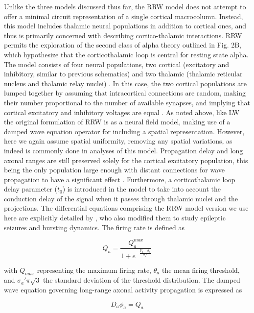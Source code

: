 \documentclass[12pt,twoside]{article}
\begin{document}
Unlike the three models discussed thus far, the RRW model does not attempt to offer a minimal circuit representation of a single cortical macrocolumn. Instead, this model includes thalamic neural populations in addition to cortical ones, and thus is primarily concerned with describing cortico-thalamic interactions. RRW permits the exploration of the second class of alpha theory outlined in Fig. 2B, which hypothesize that the corticothalamic loop is central for resting state alpha. The model consists of four neural populations, two cortical (excitatory and inhibitory, similar to previous schematics) and two thalamic (thalamic reticular nucleus and thalamic relay nuclei) \citep{robinson2002dynamics}. In this case, the two cortical populations are lumped together by assuming that intracortical connections are random, making their number proportional to the number of available synapses, and implying that cortical excitatory and inhibitory voltages are equal \citep{roberts2012corticothalamic}. As noted above, like LW the original formulation of RRW is as a neural field model, making use of a damped wave equation operator for including a spatial representation. However, here we again assume spatial uniformity, removing any spatial variations, as indeed is commonly done in analyses of this model. Propagation delay and long axonal ranges are still preserved solely for the cortical excitatory population, this being the only population large enough with distant connections for wave propagation to have a significant effect \citep{zhao2015slow}. 
Furthermore, a corticothalamic loop delay parameter ($t_0$) is introduced in the model to take into account the conduction delay of the signal when it passes through thalamic nuclei and the projections.
The differential equations comprising the RRW model version we use here are explicitly detailed by \citet{zhao2015generalized}, who also modified them to study epileptic seizures and bursting dynamics. The firing rate is defined as 

\begin{equation}
    Q_a=\frac{Q_a^{max}}{1+e^{-\frac{V_a-\theta_a}{\sigma_a'}}}
\end{equation}

with $Q_{max}$ representing the maximum firing rate, $\theta_{a}$ the mean firing threshold, and $\sigma_a'\pi \sqrt{3}$ the standard deviation of the threshold distribution. The damped wave equation governing long-range axonal activity propagation is expressed as

\begin{equation}
    D_a \phi_a=Q_a
\end{equation}
\end{document}
